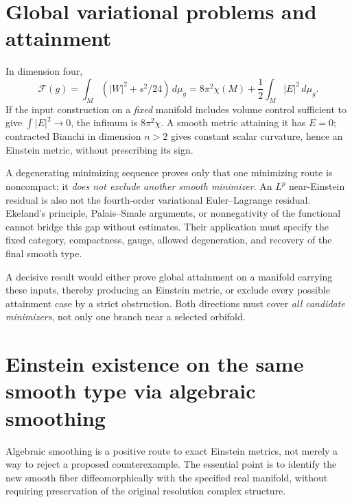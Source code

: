 \documentclass[a4paper,11pt]{article}
\numberwithin{equation}{section}
\theoremstyle{definition}
\newcommand{\dd}{\,d\mu_g}
\begin{document}
\section{Global variational problems and attainment}\label{sec:global-attainment}
In dimension four,
\begin{equation}\label{eq:F}
\mathcal F(g)=\int_M(|W|^2+s^2/24)\dd
=8\pi^2\chi(M)+\frac12\int_M|E|^2\dd.
\end{equation}
If the input construction on a \emph{fixed} manifold includes volume control sufficient to give $\int|E|^2\to0$, the infimum is $8\pi^2\chi$.
A smooth metric attaining it has $E=0$; contracted Bianchi in dimension $n>2$ gives constant scalar curvature, hence an Einstein metric, without prescribing its sign.

A degenerating minimizing sequence proves only that one minimizing route is noncompact; it \emph{does not exclude another smooth minimizer}.
An $L^p$ near-Einstein residual is also not the fourth-order variational Euler--Lagrange residual.
Ekeland's principle, Palais--Smale arguments, or nonnegativity of the functional cannot bridge this gap without estimates.
Their application must specify the fixed category, compactness, gauge, allowed degeneration, and recovery of the final smooth type.

A decisive result would either prove global attainment on a manifold carrying these inputs, thereby producing an Einstein metric, or exclude every possible attainment case by a strict obstruction.
Both directions must cover \emph{all candidate minimizers}, not only one branch near a selected orbifold.

\section{Einstein existence on the same smooth type via algebraic smoothing}\label{sec:algebraic-existence}
Algebraic smoothing is a positive route to exact Einstein metrics, not merely a way to reject a proposed counterexample.
The essential point is to identify the new smooth fiber diffeomorphically with the specified real manifold, without requiring preservation of the original resolution complex structure.
\end{document}
